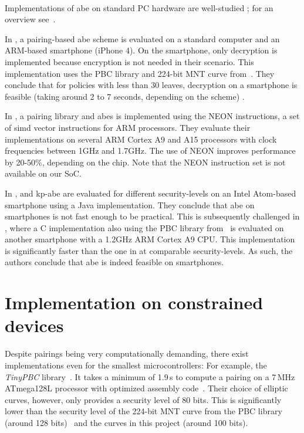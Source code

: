 ~

Implementations of \acrshort{abe} on standard PC hardware are well-studied \cite{akinyele_charm_2013,bethencourt_ciphertext-policy_2007,green_functional_nodate}; for an overview see~\cite{zickau_applied_2016}.

In \cite{akinyele_self-protecting_2010}, a pairing-based \acrshort{abe} scheme is evaluated on a standard computer and an ARM-based smartphone (iPhone 4).
On the smartphone, only decryption is implemented because encryption is not needed in their scenario.
This implementation uses the PBC library and 224-bit MNT curve from~\cite{lynn_implementation_2007}.
They conclude that for policies with less than 30 leaves, decryption on a smartphone is feasible (taking around 2 to 7 seconds, depending on the scheme) \cite{akinyele_self-protecting_2010}.

In \cite{sanchez_neon_2013}, a pairing library and \acrshort{abes} is implemented using the NEON instructions, a set of \acrshort{simd} vector instructions for ARM processors.
They evaluate their implementations on several ARM Cortex A9 and A15 processors with clock frequencies between 1GHz and 1.7GHz.
The use of NEON improves performance by 20-50\%, depending on the chip.
Note that the NEON instruction set is not available on our SoC. 

In \cite{wang_performance_2014},  and \acrshort{kp-abe} are evaluated for different \glspl{security-level} on an Intel Atom-based smartphone using a Java implementation.
They conclude that \acrshort{abe} on smartphones is not fast enough to be practical.
This is subsequently challenged in \cite{ambrosin_feasibility_2015}, where a C implementation also using the PBC library from~\cite{lynn_implementation_2007} is evaluated on another smartphone with a 1.2GHz ARM Cortex A9 CPU.
This implementation is significantly faster than the one in \cite{wang_performance_2014} at comparable \glspl{security-level}.
As such, the authors conclude that \acrshort{abe} is indeed feasible on smartphones.

\section{Implementation on constrained devices}

Despite pairings being very computationally demanding, there exist implementations even for the smallest microcontrollers:
For example, the \emph{TinyPBC} library~\cite{aranha_tinypbc_nodate}.
It takes a minimum of 1.9\,s to compute a pairing on a 7\,MHz ATmega128L processor with optimized assembly code~\cite{oliveira_tinypbc_2011}. 
Their choice of elliptic curves, however, only provides a security level of 80 bits.
This is significantly lower than the security level of the 224-bit MNT curve from the PBC library (around 128 bits)~\cite{akinyele_self-protecting_2010} and the curves in this project (around 100 bits).

